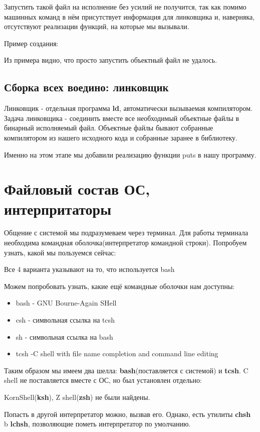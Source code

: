 \documentclass[a4paper]{article}
\begin{document}
Запустить такой файл на исполнение без усилий не получится, так как помимо машинных команд в нём присутствует информация для линковщика и, наверняка, отсутствуют реализации функций, на которые мы вызывали.

Пример создания:

Из примера видно, что просто запустить объектный файл не удалось. 
\subsection{Сборка всех воедино: линковщик}
Линковщик - отдельная программа \textbf{ld}, автоматически вызываемая компилятором. Задача линковщика - соединить вместе все необходимый объектные файлы в бинарный исполняемый файл. Объектные файлы бывают собранные компилятором из нашего исходного кода и собранные заранее в библиотеку.

Именно на этом этапе мы добавили реализацию функции puts в нашу программу.

\section{Файловый состав ОС, интерпритаторы}
Общение с системой мы подразумеваем через терминал. Для работы терминала необходима командная оболочка(интерпретатор командной строки). Попробуем узнать, какой мы пользуемся сейчас:

Все 4 варианта указывают на то, что используется bash

Можем попробовать узнать, какие ещё командные оболочки нам доступны:

\begin{itemize}
\item bash - GNU Bourne-Again SHell
\item csh - символьная ссылка на tcsh
\item sh - символьная ссылка на bash
\item tcsh -C shell with file name completion and command line editing
\end{itemize}

Таким образом мы имеем два шелла: \textbf{bash}(поставляется с системой) и \textbf{tcsh}. C shell не поставляется вместе с ОС, но был установлен отдельно:


KornShell(\textbf{ksh}), Z shell(\textbf{zsh}) не были найдены.

Попасть в другой интерпретатор можно, вызвав его. Однако, есть утилиты \textbf{chsh} b \textbf{lchsh}, позволяющие пометь интерпретатор по умолчанию.
\end{document}
